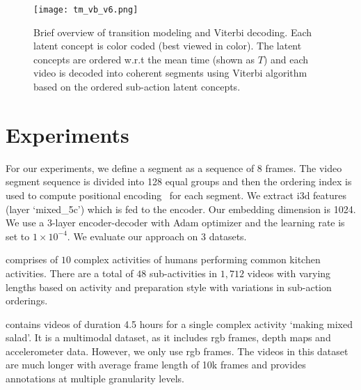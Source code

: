 \documentclass[final]{cvpr}
\begin{document}
\begin{figure}[t]
  \texttt{[image: tm\_vb\_v6.png]}
  
\caption{{\small Brief overview of transition modeling and Viterbi decoding. Each latent concept is color coded (best viewed in color). The latent concepts are ordered w.r.t the mean time (shown as $T$) and each video is decoded into coherent segments using Viterbi algorithm based on the ordered sub-action latent concepts.
}}
\vspace{-0.3cm}
\label{fig:tmvb}
\end{figure}

\section{Experiments}
\label{sec:exp}

For our experiments, we define a segment as a sequence of 8 frames. The video segment sequence is divided into 128 equal groups and then the ordering index is used to compute positional encoding~\cite{vaswani2017attention} for each segment. We extract {\sc i3d} features (layer `mixed\_5c') which is fed to the encoder. Our embedding dimension is 1024. We use a 3-layer encoder-decoder with Adam optimizer and the learning rate is set to $1 \times 10 ^{-4}$. We evaluate our approach on 3 datasets.

 comprises of $10$ complex activities of humans performing common kitchen activities. There are a total of $48$ sub-activities in $1,712$ videos with varying lengths based on activity and preparation style with variations in sub-action orderings.

 contains videos of duration 4.5 hours for a single complex activity `making mixed salad'. 
It is a multimodal dataset, as it includes {\sc rgb} frames, depth maps and accelerometer data. However, we only use {\sc rgb} frames.
The videos in this dataset are much longer with average frame length of 10k frames and provides annotations at multiple granularity levels. 
\end{document}
